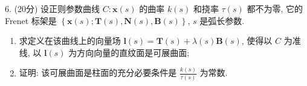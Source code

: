 \documentclass[UTF8]{ctexart}
\begin{document}
6. (20分) 设正则参数曲线 $C:\textbf{x}(s)$ 的曲率 $k(s)$ 和挠率 $\tau(s)$ 都不为零, 它的 Frenet 标架是 
$\left\{\textbf{x}(s);\textbf{T}(s),\textbf{N}(s),\textbf{B}(s)\right\}$, $s$ 是弧长参数.
\begin{enumerate}[(1)]
    \item 求定义在该曲线上的向量场 $\textbf{l}(s)=\textbf{T}(s)+\lambda(s)\textbf{B}(s)$, 使得以 $C$ 为准线, 以 $\textbf{l}(s)$ 为方向向量的直纹面是可展曲面;
    \item 证明: 该可展曲面是柱面的充分必要条件是 $\displaystyle\frac{k(s)}{\tau(s)}$ 为常数.
\end{enumerate}
\end{document}
